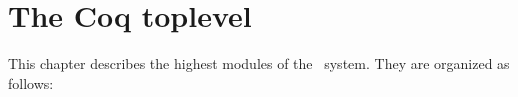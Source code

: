 
\newpage
\section*{The Coq toplevel}

\ocwsection \label{toplevel}
This chapter describes the highest modules of the \Coq\ system.
They are organized as follows:

\bigskip
\begin{center}\end{center}
